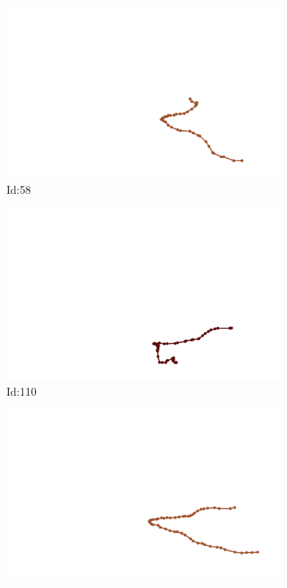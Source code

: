 \documentclass[12pt,twoside]{report}
\begin{document}
\begin{figure}
\centering
\begin{subfigure}[b]{0.20\textwidth}
\centering
\includegraphics[width=\textwidth]{../../trajectories/58.png}
\caption{Id:58}
\end{subfigure}
\begin{subfigure}[b]{0.20\textwidth}
\centering
\includegraphics[width=\textwidth]{../../trajectories/110.png}
\caption{Id:110}
\end{subfigure}
\begin{subfigure}[b]{0.20\textwidth}
\centering
\includegraphics[width=\textwidth]{../../trajectories/177.png}

\end{subfigure}
\end{figure}
\end{document}
